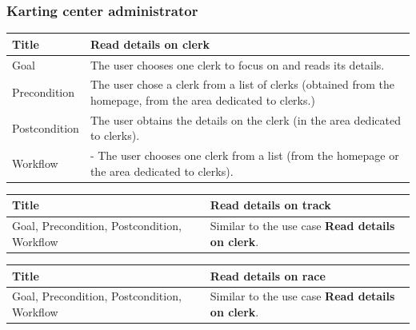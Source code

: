 \documentclass{beamer}
\begin{document}
\begin{frame}
    \frametitle{Karting center administrator}
    \begin{table}
        \tiny
        \begin{tabular}{|p{2cm}|p{6cm}|}
        \hline  
        Title & \textbf{Read details on clerk} \\
        \hline
        Goal & The user chooses one clerk to focus on and reads its details. \\
        \hline
        Precondition & The user chose a clerk from a list of clerks (obtained from the homepage,
        from the area dedicated to clerks.)\\
        \hline
        Postcondition & The user obtains the details on the clerk (in the area dedicated to clerks). \\
        \hline
        Workflow &
        - The user chooses one clerk from a list (from the homepage or the area dedicated to clerks). \\
        \hline
        \end{tabular}
\end{table}

\begin{table}
    \tiny
    \begin{tabular}{|p{2cm}|p{6cm}|}
    \hline  
    Title & \textbf{Read details on track} \\
    \hline
    Goal, Precondition, Postcondition, Workflow & Similar to the use case \textbf{Read details on clerk}.\\
    \hline
    \end{tabular}
\end{table}

\begin{table}
    \tiny
    \begin{tabular}{|p{2cm}|p{6cm}|}
    \hline  
    Title & \textbf{Read details on race} \\
    \hline
    Goal, Precondition, Postcondition, Workflow & Similar to the use case \textbf{Read details on clerk}.\\
    \hline
    \end{tabular}
\end{table}
\end{frame}
\end{document}
